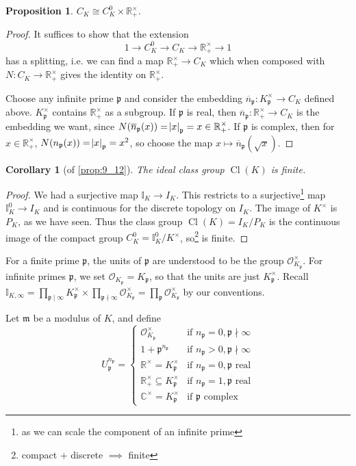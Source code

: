 \documentclass[11pt]{article}
\theoremstyle{definition}
\theoremstyle{plain}
\newtheorem{proposition}[definition]{Proposition}
\newtheorem{corollary}[definition]{Corollary}
\theoremstyle{remark}
\DeclareMathOperator{\Cl}{Cl}
\newcommand{\II}{\mathbb{I}}
\newcommand{\RR}{\mathbb{R}}
\newcommand{\CC}{\mathbb{C}}
\newcommand{\cO}{\mathcal{O}}
\newcommand{\fp}{\mathfrak{p}}
\newcommand{\fm}{\mathfrak{m}}
\begin{document}
\begin{proposition}\label{prop:9_14}
    $C_K \cong C_K^0 \times \RR_+^\times$.
\end{proposition}
\begin{proof}
    It suffices to show that the extension
    \begin{equation*}
        1 \longrightarrow C_K^0 \longrightarrow C_K \longrightarrow \RR_+^\times \longrightarrow 1
    \end{equation*}
    has a splitting, i.e. we can find a map $\RR_+^\times \to C_K$ which when composed with $N : C_K \to \RR_+^\times$ gives the identity on $\RR_+^\times$.

    Choose any infinite prime $\fp$ and consider the embedding $\overline{n}_\fp : K_\fp^\times \to C_K$ defined above. $K_\fp^\times$ contains $\RR_+^\times$ as a subgroup. If $\fp$ is real, then $\overline{n}_\fp : \RR_+^\times \to C_K$ is the embedding we want, since $N(\overline{n}_\fp(x)) = \abs{x}_\fp = x \in \RR_+^\times$. If $\fp$ is complex, then for $x \in \RR_+^\times$, $N(n_\fp(x)) = \abs{x}_\fp = x^2$, so choose the map $x \mapsto \overline{n}_\fp(\sqrt{x})$.
\end{proof}

\begin{corollary}[of \autoref{prop:9_12}]\label{cor:9_15}
    The ideal class group $\Cl(K)$ is finite.
\end{corollary}
\begin{proof}
    We had a surjective map $\II_K \to I_K$. This restricts to a surjective\footnote{as we can scale the component of an infinite prime} map $\II_K^0 \to I_K$ and is continuous for the discrete topology on $I_K$. The image of $K^\times$ is $P_K$, as we have seen. Thus the class group $\Cl(K) = I_K / P_K$ is the continuous image of the compact group $C_K^0 = \II_K^0 / K^\times$, so\footnote{compact + discrete $\implies$ finite} is finite.
\end{proof}

For a finite prime $\fp$, the units of $\fp$ are understood to be the group $\cO_{K_\fp}^\times$. For infinite primes $\fp$, we set $\cO_{K_\fp} = K_\fp$, so that the units are just $K_\fp^\times$. Recall $\II_{K, \infty} = \prod_{\fp \mid \infty} K_\fp^\times \times \prod_{\fp \nmid \infty} \cO_{K_\fp}^\times = \prod_\fp \cO_{K_\fp}^\times$ by our conventions.

Let $\fm$ be a modulus of $K$, and define
\begin{equation*}
    U_\fp^{n_\fp} =
    \begin{cases}
        \cO_{K_\fp}^\times & \text{if } n_\fp = 0, \fp \nmid \infty\\
        1 + \fp^{n_\fp} & \text{if } n_\fp > 0, \fp \nmid \infty\\
        \RR^\times = K_\fp^\times & \text{if } n_\fp = 0, \fp \text{ real}\\
        \RR_+^\times \subseteq K_\fp^\times & \text{if } n_\fp = 1, \fp \text{ real}\\
        \CC^\times = K_\fp^\times & \text{if } \fp \text{ complex}
    \end{cases}
\end{equation*}
\end{document}

